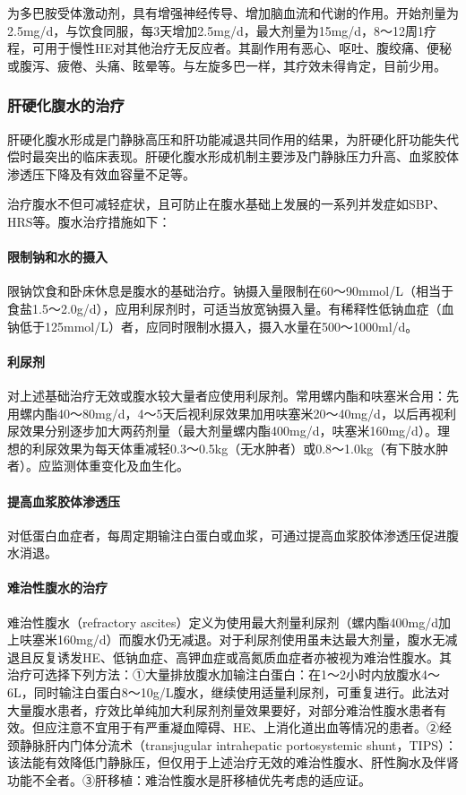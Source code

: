 为多巴胺受体激动剂，具有增强神经传导、增加脑血流和代谢的作用。开始剂量为2.5mg/d，与饮食同服，每3天增加2.5mg/d，最大剂量为15mg/d，8～12周1疗程，可用于慢性HE对其他治疗无反应者。其副作用有恶心、呕吐、腹绞痛、便秘或腹泻、疲倦、头痛、眩晕等。与左旋多巴一样，其疗效未得肯定，目前少用。

\subsubsection{肝硬化腹水的治疗}

肝硬化腹水形成是门静脉高压和肝功能减退共同作用的结果，为肝硬化肝功能失代偿时最突出的临床表现。肝硬化腹水形成机制主要涉及门静脉压力升高、血浆胶体渗透压下降及有效血容量不足等。

治疗腹水不但可减轻症状，且可防止在腹水基础上发展的一系列并发症如SBP、HRS等。腹水治疗措施如下：

\paragraph{限制钠和水的摄入}

限钠饮食和卧床休息是腹水的基础治疗。钠摄入量限制在60～90mmol/L（相当于食盐1.5～2.0g/d），应用利尿剂时，可适当放宽钠摄入量。有稀释性低钠血症（血钠低于125mmol/L）者，应同时限制水摄入，摄入水量在500～1000ml/d。

\paragraph{利尿剂}

对上述基础治疗无效或腹水较大量者应使用利尿剂。常用螺内酯和呋塞米合用：先用螺内酯40～80mg/d，4～5天后视利尿效果加用呋塞米20～40mg/d，以后再视利尿效果分别逐步加大两药剂量（最大剂量螺内酯400mg/d，呋塞米160mg/d）。理想的利尿效果为每天体重减轻0.3～0.5kg（无水肿者）或0.8～1.0kg（有下肢水肿者）。应监测体重变化及血生化。

\paragraph{提高血浆胶体渗透压}

对低蛋白血症者，每周定期输注白蛋白或血浆，可通过提高血浆胶体渗透压促进腹水消退。

\paragraph{难治性腹水的治疗}

难治性腹水（refractory
ascites）定义为使用最大剂量利尿剂（螺内酯400mg/d加上呋塞米160mg/d）而腹水仍无减退。对于利尿剂使用虽未达最大剂量，腹水无减退且反复诱发HE、低钠血症、高钾血症或高氮质血症者亦被视为难治性腹水。其治疗可选择下列方法：①大量排放腹水加输注白蛋白：在1～2小时内放腹水4～6L，同时输注白蛋白8～10g/L腹水，继续使用适量利尿剂，可重复进行。此法对大量腹水患者，疗效比单纯加大利尿剂剂量效果要好，对部分难治性腹水患者有效。但应注意不宜用于有严重凝血障碍、HE、上消化道出血等情况的患者。②经颈静脉肝内门体分流术（transjugular
intrahepatic portosystemic
shunt，TIPS）：该法能有效降低门静脉压，但仅用于上述治疗无效的难治性腹水、肝性胸水及伴肾功能不全者。③肝移植：难治性腹水是肝移植优先考虑的适应证。

